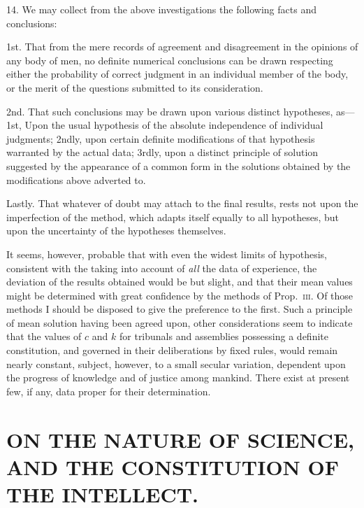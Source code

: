 \documentclass[oneside]{book}
\begin{document}
14. We may collect from the above investigations the following facts and conclusions:

1st. That from the mere records of agreement and disagreement in the opinions of any body of men, no definite numerical
conclusions can be drawn respecting either the probability of
correct judgment in an individual member of the body, or the merit
of the questions submitted to its consideration.

2nd. That such conclusions may be drawn upon various distinct hypotheses, as---1st, Upon the usual hypothesis of the absolute independence of individual judgments; 2ndly, upon certain
definite modifications of that hypothesis warranted by the actual
data; 3rdly, upon a distinct principle of solution suggested by
the appearance of a common form in the solutions obtained by
the modifications above adverted to.

Lastly. That whatever of doubt may attach to the final results, rests not upon the imperfection of the method, which
adapts itself equally to all hypotheses, but upon the uncertainty
of the hypotheses themselves.

It seems, however, probable that with even the widest limits
of hypothesis, consistent with the taking into account of \emph{all} the
data of experience, the deviation of the results obtained would be
but slight, and that their mean values might be determined with
great confidence by the methods of Prop.~\textsc{iii}. Of those methods
I should be disposed to give the preference to the first. Such a
principle of mean solution having been agreed upon, other considerations seem to indicate that the values of $c$ and $k$ for tribunals
and assemblies possessing a definite constitution, and governed
in their deliberations by fixed rules, would remain nearly constant, subject, however, to a small secular variation, dependent
upon the progress of knowledge and of justice among mankind.
There exist at present few, if any, data proper for their determination.





\chapter[CONSTITUTION OF THE
INTELLECT]{\large ON THE NATURE OF SCIENCE, AND THE CONSTITUTION OF THE
INTELLECT.}
\end{document}
